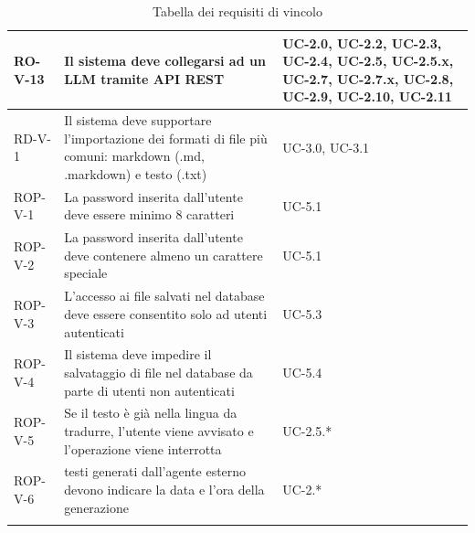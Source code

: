 \documentclass[11pt,a4paper]{article}
\begin{document}
\begin{longtable}{|p{}|>{\raggedright\arraybackslash}p{}|p{}|}
\hline
RO-V-13 & Il sistema deve collegarsi ad un LLM tramite API REST & UC-2.0, UC-2.2, UC-2.3, UC-2.4, UC-2.5, UC-2.5.x, UC-2.7, UC-2.7.x, UC-2.8, UC-2.9, UC-2.10, UC-2.11 \\
\hline
RD-V-1 & Il sistema deve supportare l'importazione dei formati di file più comuni: markdown (.md, .markdown) e testo (.txt) & UC-3.0, UC-3.1 \\
\hline
ROP-V-1 & La password inserita dall'utente deve essere minimo 8 caratteri & UC-5.1 \\
\hline
ROP-V-2 & La password inserita dall'utente deve contenere almeno un carattere speciale & UC-5.1 \\
\hline
ROP-V-3 & L'accesso ai file salvati nel database deve essere consentito solo ad utenti autenticati & UC-5.3 \\
\hline
ROP-V-4 & Il sistema deve impedire il salvataggio di file nel database da parte di utenti non autenticati & UC-5.4 \\
\hline
ROP-V-5 & Se il testo è già nella lingua da tradurre, l'utente viene avvisato e l'operazione viene interrotta & UC-2.5.* \\
\hline
ROP-V-6 &  testi generati dall’agente esterno devono indicare la data e l’ora della generazione & UC-2.* \\
\hline
\addlinespace[1em]
\caption{Tabella dei requisiti di vincolo}
\end{longtable}


\newpage
\end{document}
